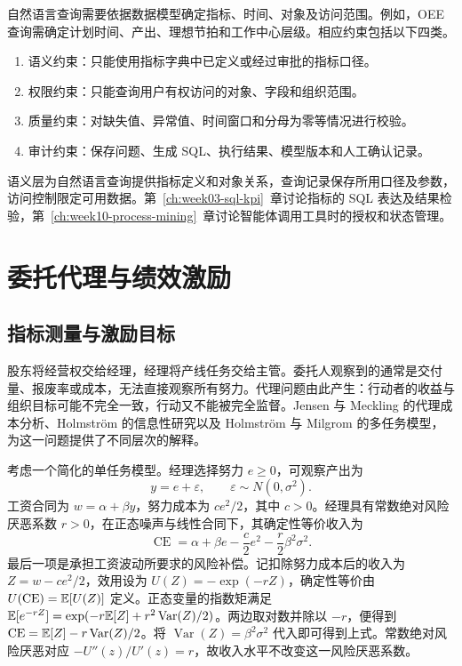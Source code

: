 自然语言查询需要依据数据模型确定指标、时间、对象及访问范围。例如，OEE 查询需确定计划时间、产出、理想节拍和工作中心层级。相应约束包括以下四类。

\begin{enumerate}
  \item 语义约束：只能使用指标字典中已定义或经过审批的指标口径。
  \item 权限约束：只能查询用户有权访问的对象、字段和组织范围。
  \item 质量约束：对缺失值、异常值、时间窗口和分母为零等情况进行校验。
  \item 审计约束：保存问题、生成 SQL、执行结果、模型版本和人工确认记录。
\end{enumerate}

语义层为自然语言查询提供指标定义和对象关系，查询记录保存所用口径及参数，访问控制限定可用数据。第~\ref{ch:week03-sql-kpi}~章讨论指标的 SQL 表达及结果检验，第~\ref{ch:week10-process-mining}~章讨论智能体调用工具时的授权和状态管理。

\section{委托代理与绩效激励}

\subsection{指标测量与激励目标}
股东将经营权交给经理，经理将产线任务交给主管。委托人观察到的通常是交付量、报废率或成本，无法直接观察所有努力。代理问题由此产生：行动者的收益与组织目标可能不完全一致，行动又不能被完全监督。Jensen 与 Meckling 的代理成本分析、Holmström 的信息性研究以及 Holmström 与 Milgrom 的多任务模型，为这一问题提供了不同层次的解释\cite{jensen1976,holmstrom79,hm91}。

考虑一个简化的单任务模型。经理选择努力 \(e\ge0\)，可观察产出为
\[
y=e+\varepsilon,\qquad \varepsilon\sim N(0,\sigma^2).
\]
工资合同为 \(w=\alpha+\beta y\)，努力成本为 \(ce^2/2\)，其中 \(c>0\)。经理具有常数绝对风险厌恶系数 \(r>0\)，在正态噪声与线性合同下，其确定性等价收入为
\[
\operatorname{CE}
=\alpha+\beta e-\frac c2e^2-\frac r2\beta^2\sigma^2.
\]
最后一项是承担工资波动所要求的风险补偿。记扣除努力成本后的收入为 \(Z=w-ce^2/2\)，效用设为 \(U(Z)=-\exp(-rZ)\)，确定性等价由 \(U(\operatorname{CE})=\mathbb E[U(Z)]\) 定义。正态变量的指数矩满足
\(\mathbb E[e^{-rZ}]=\exp(-r\mathbb E[Z]+r^2\operatorname{Var}(Z)/2)\)。两边取对数并除以 \(-r\)，便得到 \(\operatorname{CE}=\mathbb E[Z]-r\operatorname{Var}(Z)/2\)。将 \(\operatorname{Var}(Z)=\beta^2\sigma^2\) 代入即可得到上式。常数绝对风险厌恶对应 \(-U''(z)/U'(z)=r\)，故收入水平不改变这一风险厌恶系数。

